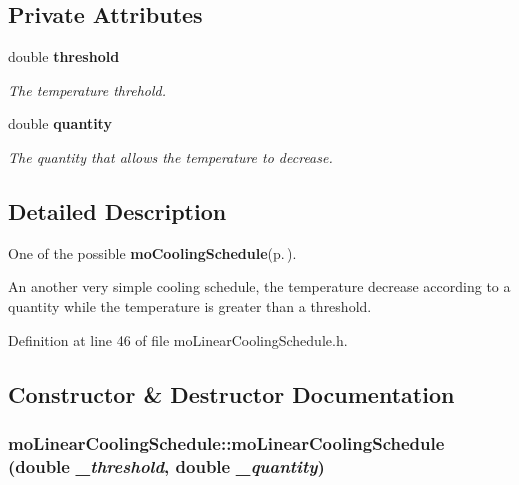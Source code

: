\subsection*{Private Attributes}
\begin{CompactItemize}
\item 
double {\bf threshold}\label{classmo_linear_cooling_schedule_r0}

\begin{CompactList}\small\item\em The temperature threhold. \item\end{CompactList}\item 
double {\bf quantity}\label{classmo_linear_cooling_schedule_r1}

\begin{CompactList}\small\item\em The quantity that allows the temperature to decrease. \item\end{CompactList}\end{CompactItemize}


\subsection{Detailed Description}
One of the possible {\bf mo\-Cooling\-Schedule}{\rm (p.\,\pageref{classmo_cooling_schedule})}. 

An another very simple cooling schedule, the temperature decrease according to a quantity while the temperature is greater than a threshold. 



Definition at line 46 of file mo\-Linear\-Cooling\-Schedule.h.

\subsection{Constructor \& Destructor Documentation}
\subsubsection{\setlength{\rightskip}{0pt plus 5cm}mo\-Linear\-Cooling\-Schedule::mo\-Linear\-Cooling\-Schedule (double {\em \_\-threshold}, double {\em \_\-quantity})\hspace{0.3cm}{\tt  [inline]}}\label{classmo_linear_cooling_schedule_a0}


